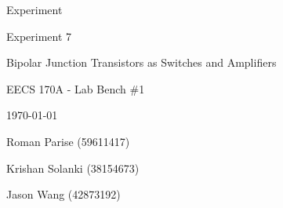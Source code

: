 \begin{titlepage}
	\centering
	\vspace{2.5cm}
	{\huge Experiment \expnum \par}
	\vspace{1cm}
	{\huge Experiment 7 \par}
	{\LARGE Bipolar Junction Transistors as Switches and Amplifiers \par}
	{\Large EECS 170A - Lab Bench \#1 \par}
	{\Large \today \par}
	\vspace{1cm}
	{\large Roman Parise (59611417) \par}
	{\large Krishan Solanki (38154673) \par}
	{\large Jason Wang (42873192) \par}
	\vspace{1cm}
\end{titlepage}




